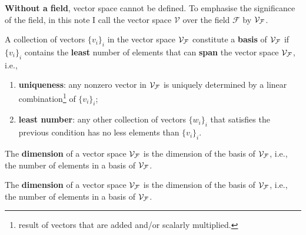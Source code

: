 \begin{remark}
\textbf{Without a field}, vector space cannot be defined.
To emphasise the significance of the field, in this note I call the vector space $\mathcal{V}$ over the field $\mathcal{F}$ by $\mathcal{V}_{\mathcal{F}}$.
\end{remark}

\begin{definition}
A collection of vectors $\{v_i\}_i$ in the vector space $\mathcal{V}_{\mathcal{F}}$ constitute a \textbf{basis} of $\mathcal{V}_{\mathcal{F}}$ if $\{v_i\}_i$ contains the \textbf{least} number of elements that can \textbf{span} the vector space $\mathcal{V}_{\mathcal{F}}$, i.e., 
\begin{enumerate}
    \item \textbf{uniqueness}: any nonzero vector in $\mathcal{V}_{\mathcal{F}}$ is uniquely determined by a linear combination\footnote{result of vectors that are added and/or scalarly multiplied.} of $\{v_i\}_i$;
    \item \textbf{least number}: any other collection of vectors $\{w_i\}_i$ that satisfies the previous condition has no less elements than $\{v_i\}_i$.
\end{enumerate}
\end{definition}

\begin{definition}
The \textbf{dimension} of a vector space $\mathcal{V}_{\mathcal{F}}$ is the dimension of the basis of $\mathcal{V}_{\mathcal{F}}$, i.e., the number of elements in a basis of $\mathcal{V}_{\mathcal{F}}$.
\end{definition}


\begin{definition}
The \textbf{dimension} of a vector space $\mathcal{V}_{\mathcal{F}}$ is the dimension of the basis of $\mathcal{V}_{\mathcal{F}}$, i.e., the number of elements in a basis of $\mathcal{V}_{\mathcal{F}}$.
\end{definition}




